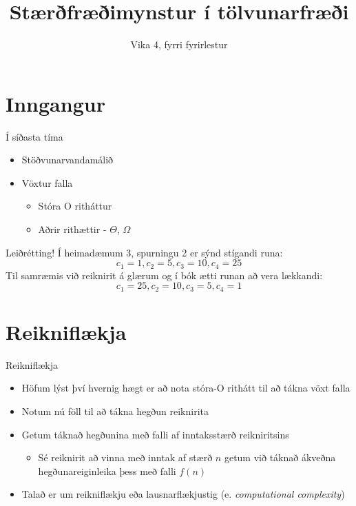 \documentclass[handout]{beamer}
\title{Stærðfræðimynstur í tölvunarfræði}
\subtitle{Vika 4, fyrri fyrirlestur}
\begin{document}
\begin{frame}
\titlepage
\end{frame}


\section{Inngangur}

\begin{frame}{Í síðasta tíma}
\begin{itemize}
 \item Stöðvunarvandamálið
 \item Vöxtur falla
 \begin{itemize}
  \item Stóra O ritháttur
  \item Aðrir rithættir - $\Theta$, $\Omega$
 \end{itemize}
\end{itemize}
\end{frame}

\begin{frame}{Leiðrétting!}
Í heimadæmum 3, spurningu 2 er sýnd stígandi runa:
\[
 c_1 = 1, c_2 = 5, c_3 = 10, c_4 = 25
\]
Til samræmis við reiknirit á glærum og í bók ætti runan að vera lækkandi:
\[
 c_1 = 25, c_2 = 10, c_3 = 5, c_4 = 1
\]
\end{frame}

\section{Reikniflækja}

\begin{frame}{Reikniflækja}
\begin{itemize}
 \item Höfum lýst því hvernig hægt er að nota stóra-O rithátt til að tákna vöxt falla
 \item Notum nú föll til að tákna hegðun reiknirita
 \item Getum táknað hegðunina með falli af inntaksstærð reikniritsins
 \begin{itemize}
  \item Sé reiknirit að vinna með inntak af stærð $n$ getum við táknað ákveðna hegðunareiginleika þess með falli $f(n)$
 \end{itemize}
 \item Talað er um reikniflækju eða lausnarflækjustig (e. \emph{computational complexity})
\end{itemize}
\end{frame}
\end{document}

